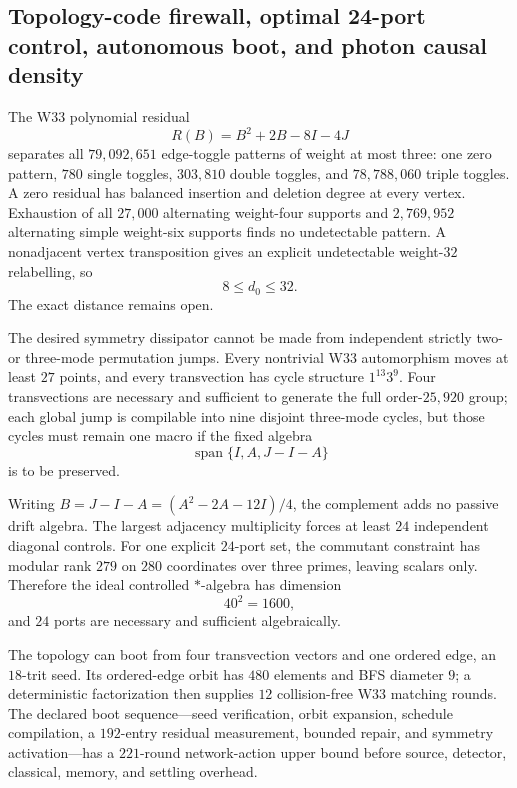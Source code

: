 \subsection{Topology-code firewall, optimal 24-port control, autonomous boot, and photon causal density}
\label{sec:bt3965-3972}

The W33 polynomial residual
\[
R(B)=B^2+2B-8I-4J
\]
separates all $79{,}092{,}651$ edge-toggle patterns of weight at most three: one zero pattern, $780$ single toggles, $303{,}810$ double toggles, and $78{,}788{,}060$ triple toggles.  A zero residual has balanced insertion and deletion degree at every vertex. Exhaustion of all $27{,}000$ alternating weight-four supports and $2{,}769{,}952$ alternating simple weight-six supports finds no undetectable pattern.  A nonadjacent vertex transposition gives an explicit undetectable weight-$32$ relabelling, so
\[
8\le d_0\le32.
\]
The exact distance remains open.

The desired symmetry dissipator cannot be made from independent strictly two- or three-mode permutation jumps.  Every nontrivial W33 automorphism moves at least $27$ points, and every transvection has cycle structure $1^{13}3^9$. Four transvections are necessary and sufficient to generate the full order-$25{,}920$ group; each global jump is compilable into nine disjoint three-mode cycles, but those cycles must remain one macro if the fixed algebra
\[
\operatorname{span}\{I,A,J-I-A\}
\]
is to be preserved.

Writing $B=J-I-A=(A^2-2A-12I)/4$, the complement adds no passive drift algebra.  The largest adjacency multiplicity forces at least $24$ independent diagonal controls.  For one explicit $24$-port set, the commutant constraint has modular rank $279$ on $280$ coordinates over three primes, leaving scalars only.  Therefore the ideal controlled $*$-algebra has dimension
\[
40^2=1600,
\]
and $24$ ports are necessary and sufficient algebraically.

The topology can boot from four transvection vectors and one ordered edge, an $18$-trit seed.  Its ordered-edge orbit has $480$ elements and BFS diameter $9$; a deterministic factorization then supplies $12$ collision-free W33 matching rounds.  The declared boot sequence---seed verification, orbit expansion, schedule compilation, a $192$-entry residual measurement, bounded repair, and symmetry activation---has a $221$-round network-action upper bound before source, detector, classical, memory, and settling overhead.

